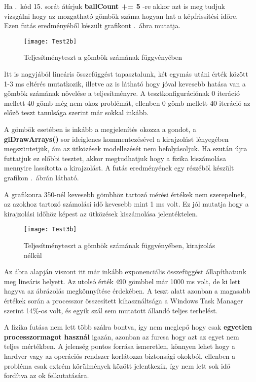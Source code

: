 Ha .~kód 15. sorát átírjuk \textbf{ballCount += 5} -re akkor azt is meg tudjuk vizsgálni hogy az mozgatható gömbök száma hogyan hat a képfrissítési időre. Ezen futás eredményéből készült grafikont .~ábra mutatja.

\begin{figure}[H]
	\centering
	\texttt{[image: Test2b]}
	\caption{Teljesítményteszt a gömbök számának függvényében}
	\label{fig:Test2}
\end{figure}

Itt is nagyjából lineáris összefüggést tapasztalunk, két egymás utáni érték között 1-3 ms eltérés mutatkozik, illetve az is látható hogy jóval kevesebb hatása van a gömbök számának növelése a teljesítményre. A tesztkonfigurációnak 0 iteráció mellett 40 gömb még nem okoz problémát, ellenben 0 gömb mellett 40 iteráció az előző teszt tanulsága szerint már sokkal inkább.

A gömbök esetében is inkább a megjelenítés okozza a gondot, a \textbf{glDrawArrays()} sor ideiglenes kommentezésével a kirajzolást lényegében megszüntetjük, ám az ütközések modellezését nem befolyásoljuk. Ha ezután újra futtatjuk ez előbbi tesztet, akkor megtudhatjuk hogy a fizika kiszámolása mennyire lassította a kirajzolást. A futás eredményének egy részéből készült grafikon .~ábrán látható. 

A grafikonra 350-nél kevesebb gömbhöz tartozó mérési értékek nem szerepelnek, az azokhoz tartozó számolási idő kevesebb mint 1 ms volt. Ez jól mutatja hogy a kirajzolási időhöz képest az ütközések kiszámolása jelentéktelen.

\begin{figure}[H]
	\centering
	\texttt{[image: Test3b]}
	\caption{Teljesítményteszt a gömbök számának függvényében, kirajzolás nélkül}
	\label{fig:Test3}
\end{figure}

Az ábra alapján viszont itt már inkább exponenciális összefüggést állapíthatunk meg lineáris helyett. Az utolsó érték 490 gömbbel már 1000 ms volt, de ki lett hagyva az ábrázolás megkönnyítése érdekében. A teszt alatt azonban a magasabb értékek során a processzor összesített kihasználtsága a Windows Task Manager szerint 14\%-os volt, és egyik szál sem mutatott állandó teljes terhelést. 

A fizika futása nem lett több szálra bontva, így nem meglepő hogy csak \textbf{egyetlen processzormagot használ} igazán, azonban az furcsa hogy azt az egyet nem teljes mértékben. A jelenség pontos forrása ismeretlen, könnyen lehet hogy a hardver vagy az operációs rendszer korlátozza biztonsági okokból, ellenben a probléma csak extrém körülmények között jelentkezik, így nem lett sok idő fordítva az ok felkutatására. 

